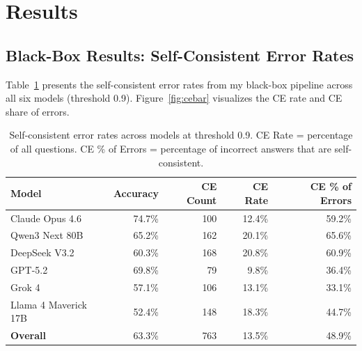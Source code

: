 \documentclass[11pt]{article}
\begin{document}
\section{Results}

\subsection{Black-Box Results: Self-Consistent Error Rates}

Table~\ref{tab:cerates} presents the self-consistent error rates from my black-box pipeline across all six models (threshold 0.9). Figure~\ref{fig:cebar} visualizes the CE rate and CE share of errors.

\begin{table}[H]
\centering
\begin{tabular}{lrrrr}
\toprule
\textbf{Model} & \textbf{Accuracy} & \textbf{CE Count} & \textbf{CE Rate} & \textbf{CE \% of Errors} \\
\midrule
Claude Opus 4.6     & 74.7\% & 100 & 12.4\% & 59.2\% \\
Qwen3 Next 80B      & 65.2\% & 162 & 20.1\% & 65.6\% \\
DeepSeek V3.2        & 60.3\% & 168 & 20.8\% & 60.9\% \\
GPT-5.2              & 69.8\% &  79 &  9.8\% & 36.4\% \\
Grok 4               & 57.1\% & 106 & 13.1\% & 33.1\% \\
Llama 4 Maverick 17B & 52.4\% & 148 & 18.3\% & 44.7\% \\
\midrule
\textbf{Overall}     & 63.3\% & 763 & 13.5\% & 48.9\% \\
\bottomrule
\end{tabular}
\caption{Self-consistent error rates across models at threshold 0.9. CE Rate = percentage of all questions. CE \% of Errors = percentage of incorrect answers that are self-consistent.}
\label{tab:cerates}
\end{table}
\end{document}

